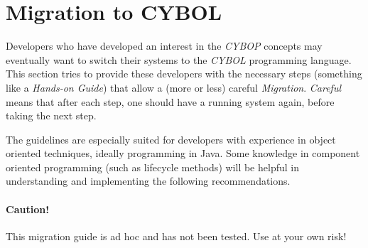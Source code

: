 %
%
%
%
%
%
%

\section{Migration to CYBOL}
\label{migration_to_cybol_heading}

Developers who have developed an interest in the \emph{CYBOP} concepts may
eventually want to switch their systems to the \emph{CYBOL} programming language.
This section tries to provide these developers with the necessary steps
(something like a \emph{Hands-on Guide}) that allow a (more or less) careful
\emph{Migration}. \emph{Careful} means that after each step, one should have a
running system again, before taking the next step.

The guidelines are especially suited for developers with experience in object
oriented techniques, ideally programming in Java. Some knowledge in component
oriented programming (such as lifecycle methods) will be helpful in understanding
and implementing the following recommendations.

\paragraph{Caution!}
This migration guide is ad hoc and has not been tested. Use at your own risk!

